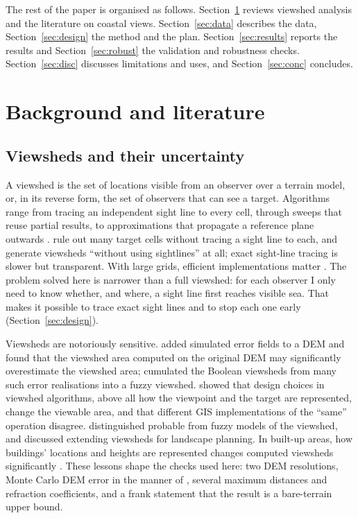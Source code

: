 \documentclass[11pt,a4paper]{article}
\begin{document}
The rest of the paper is organised as follows. Section~\ref{sec:lit} reviews viewshed analysis and the literature on coastal views. Section~\ref{sec:data} describes the data, Section~\ref{sec:design} the method and the plan. Section~\ref{sec:results} reports the results and Section~\ref{sec:robust} the validation and robustness checks. Section~\ref{sec:disc} discusses limitations and uses, and Section~\ref{sec:conc} concludes.

\section{Background and literature}\label{sec:lit}
\subsection{Viewsheds and their uncertainty}
A viewshed is the set of locations visible from an observer over a terrain model, or, in its reverse form, the set of observers that can see a target. Algorithms range from tracing an independent sight line to every cell, through sweeps that reuse partial results, to approximations that propagate a reference plane outwards \citep{franklin1994,vankreveld1996,wang1996,wang2000,defloriani2003}. \citet{wang1996} rule out many target cells without tracing a sight line to each, and \citet{wang2000} generate viewsheds ``without using sightlines'' at all; exact sight-line tracing is slower but transparent. With large grids, efficient implementations matter \citep{tabik2013}. The problem solved here is narrower than a full viewshed: for each observer I only need to know whether, and where, a sight line first reaches visible sea. That makes it possible to trace exact sight lines and to stop each one early (Section~\ref{sec:design}).

Viewsheds are notoriously sensitive. \citet{fisher1991} added simulated error fields to a DEM and found that the viewshed area computed on the original DEM may significantly overestimate the viewshed area; \citet{fisher1992} cumulated the Boolean viewsheds from many such error realisations into a fuzzy viewshed. \citet{fisher1993} showed that design choices in viewshed algorithms, above all how the viewpoint and the target are represented, change the viewable area, and that different GIS implementations of the ``same'' operation disagree. \citet{fisher1994} distinguished probable from fuzzy models of the viewshed, and \citet{fisher1996} discussed extending viewsheds for landscape planning. In built-up areas, how buildings' locations and heights are represented changes computed viewsheds significantly \citep{sander2007}. These lessons shape the checks used here: two DEM resolutions, Monte Carlo DEM error in the manner of \citet{fisher1991,fisher1992}, several maximum distances and refraction coefficients, and a frank statement that the result is a bare-terrain upper bound.
\end{document}
